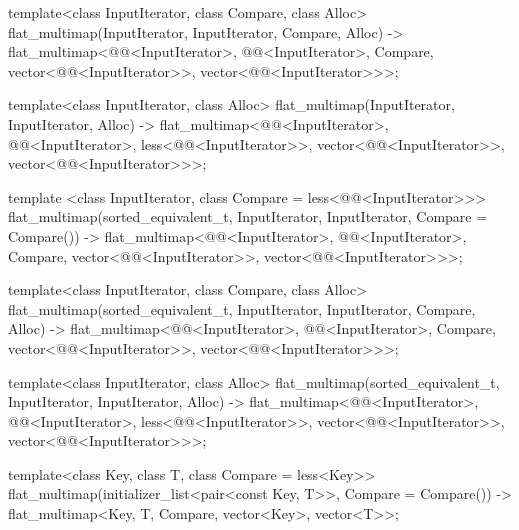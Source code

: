 \begin{codeblock}
\begin{codeblock}
\begin{codeblock}
\begin{addedblock}
\begin{codeblock}
{  template<class InputIterator, class Compare, class Alloc>
    flat_multimap(InputIterator, InputIterator, Compare, Alloc)
      -> flat_multimap<@@<InputIterator>, @@<InputIterator>,
                       Compare, vector<@@<InputIterator>>,
                       vector<@@<InputIterator>>>;

  template<class InputIterator, class Alloc>
    flat_multimap(InputIterator, InputIterator, Alloc)
      -> flat_multimap<@@<InputIterator>, @@<InputIterator>,
                       less<@@<InputIterator>>,
                       vector<@@<InputIterator>>,
                       vector<@@<InputIterator>>>;

  template <class InputIterator, class Compare = less<@@<InputIterator>>>
    flat_multimap(sorted_equivalent_t, InputIterator, InputIterator,
                  Compare = Compare())
      -> flat_multimap<@@<InputIterator>, @@<InputIterator>, Compare,
                       vector<@@<InputIterator>>,
                       vector<@@<InputIterator>>>;

  template<class InputIterator, class Compare, class Alloc>
    flat_multimap(sorted_equivalent_t, InputIterator, InputIterator, Compare, Alloc)
      -> flat_multimap<@@<InputIterator>, @@<InputIterator>,
                       Compare, vector<@@<InputIterator>>,
                       vector<@@<InputIterator>>>;

  template<class InputIterator, class Alloc>
    flat_multimap(sorted_equivalent_t, InputIterator, InputIterator, Alloc)
      -> flat_multimap<@@<InputIterator>, @@<InputIterator>,
                       less<@@<InputIterator>>,
                       vector<@@<InputIterator>>,
                       vector<@@<InputIterator>>>;

  template<class Key, class T, class Compare = less<Key>>
    flat_multimap(initializer_list<pair<const Key, T>>, Compare = Compare())
      -> flat_multimap<Key, T, Compare, vector<Key>, vector<T>>;

}
\end{codeblock}
\end{addedblock}
\end{codeblock}
\end{codeblock}
\end{codeblock}
